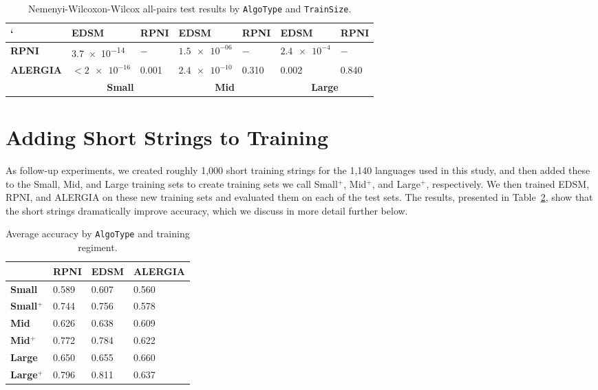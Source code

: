 \documentclass[twoside,11pt]{article}
\newcommand{\ttt}[1]{\texttt{#1}}
\newcommand{\tbf}[1]{\textbf{#1}}
\newcommand{\tttx}[1]{\ttt{#1}\xspace}
\newcommand{\TrainSize}{\tttx{TrainSize}}
\newcommand{\AlgoType}{\tttx{AlgoType}}
\begin{document}
\begin{table}[!h]
    \centering
    \begin{tabular}{lll|ll|ll}
    \toprule
    `             & \tbf{EDSM} & \tbf{RPNI} & \tbf{EDSM} & \tbf{RPNI} & \tbf{EDSM} & \tbf{RPNI} \\
    \midrule
    \tbf{RPNI}    & \num{3.7e-14}   & $-$   & $\num{1.5e-06}$ & $-$   & $\num{2.4e-4}$ & $-$  \\
    \tbf{ALERGIA} & $< \num{2e-16}$ & 0.001 & $\num{2.4e-10}$ & 0.310 & 0.002          & 0.840 \\
    \bottomrule
            & \multicolumn{2}{c}{\tbf{Small}}
            & \multicolumn{2}{c}{\tbf{Mid}}
            & \multicolumn{2}{c}{\tbf{Large}}
    \end{tabular}
    \caption{Nemenyi-Wilcoxon-Wilcox all-pairs test results by \AlgoType and \TrainSize.}
    \label{tab:algo-type-nww}
\end{table}

\section{Adding Short Strings to Training}
\label{sec:shorttrain}

As follow-up experiments, we created roughly 1,000 short training strings for the 1,140 languages used in this study, and then added these to the Small, Mid, and Large training sets to create training sets we call Small$^+$, Mid$^+$, and Large$^+$, respectively.
We then trained EDSM, RPNI, and ALERGIA on these new training sets and evaluated them on each of the test sets. 
The results, presented in Table~\ref{tab:acc-network-by-train-short}, show that the short strings dramatically improve accuracy, which we discuss in more detail further below.

\begin{table}
\centering
  \begin{tabular}{llll}
    \toprule
                    & \tbf{RPNI} & \tbf{EDSM} & \tbf{ALERGIA} \\
    \midrule
    \tbf{Small}     & 0.589      & 0.607      & 0.560         \\
    \tbf{Small$^+$} & 0.744      & 0.756      & 0.578         \\
    \midrule
    \tbf{Mid}       & 0.626      & 0.638      & 0.609         \\
    \tbf{Mid$^+$}   & 0.772      & 0.784      & 0.622         \\
    \midrule
    \tbf{Large}     & 0.650      & 0.655      & 0.660         \\
    \tbf{Large$^+$} & 0.796      & 0.811      & 0.637         \\
    \bottomrule
  \end{tabular}
  \caption{Average accuracy by \AlgoType and training regiment.}
  \label{tab:acc-network-by-train-short}
\end{table}
\end{document}

